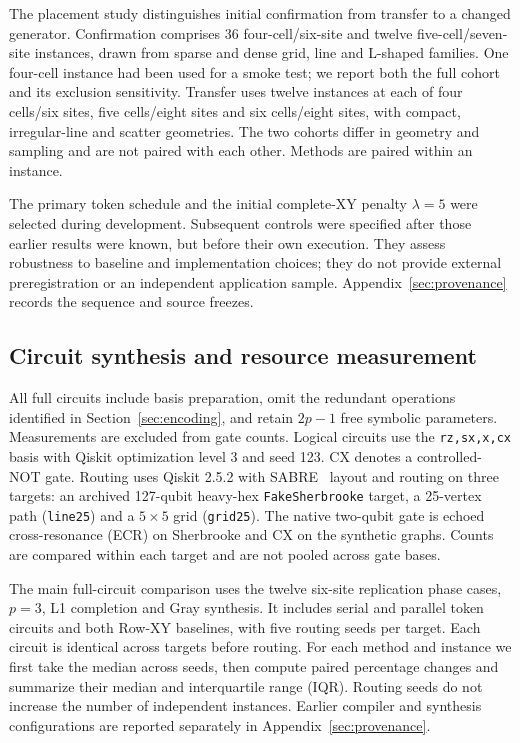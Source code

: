 \documentclass[manuscript,screen,review]{acmart}
\begin{document}
The placement study distinguishes initial confirmation from transfer to a
changed generator. Confirmation comprises 36 four-cell/six-site and twelve
five-cell/seven-site instances, drawn from sparse and dense grid, line and
L-shaped families. One four-cell instance had been used for a smoke test;
we report both the full cohort and its exclusion sensitivity. Transfer uses
twelve instances at each of four cells/six sites, five cells/eight sites
and six cells/eight sites, with compact, irregular-line and scatter
geometries. The two cohorts differ in geometry and sampling and are not paired
with each other. Methods are paired within an instance.

The primary token schedule and the initial complete-XY penalty
$\lambda=5$ were selected during development. Subsequent controls were
specified after those earlier results were known, but before their own
execution. They assess robustness to baseline and implementation choices;
they do not provide external preregistration or an independent application
sample. Appendix~\ref{sec:provenance} records the sequence and source freezes.

\subsection{Circuit synthesis and resource measurement}
\label{sec:compile}
All full circuits include basis preparation, omit the redundant operations
identified in Section~\ref{sec:encoding}, and retain $2p-1$ free symbolic
parameters. Measurements are excluded from gate counts. Logical circuits
use the \texttt{rz,sx,x,cx} basis with Qiskit optimization level 3 and seed
123. CX denotes a controlled-NOT gate. Routing uses Qiskit 2.5.2 with SABRE~\cite{li2019sabre}
layout and routing on three targets: an archived 127-qubit heavy-hex
\texttt{FakeSherbrooke} target, a 25-vertex path (\texttt{line25}) and a
$5\times5$ grid (\texttt{grid25}). The native two-qubit gate is echoed
cross-resonance (ECR) on Sherbrooke and CX on the synthetic graphs. Counts
are compared within each target and are not pooled across gate bases.

The main full-circuit comparison uses the twelve six-site replication phase
cases, $p=3$, L1 completion and Gray synthesis. It includes serial and
parallel token circuits and both Row-XY baselines, with five routing seeds
per target. Each circuit is identical across targets before routing.
For each method and instance we first take the median across seeds, then
compute paired percentage changes and summarize their median and
interquartile range (IQR). Routing seeds do not increase the number of
independent instances. Earlier compiler and synthesis configurations are
reported separately in Appendix~\ref{sec:provenance}.
\end{document}
